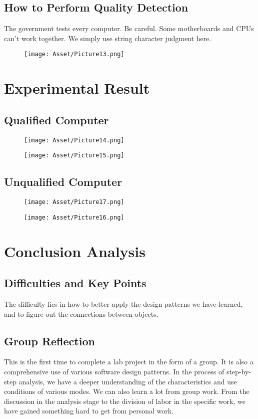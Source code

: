 \documentclass{article}
\begin{document}
\subsection{How to Perform Quality Detection}
    The government tests every computer. Be careful. Some motherboards and CPUs can't work together. We simply use string character judgment here.

\begin{figure}
\centering
\texttt{[image: Asset/Picture13.png]}
\end{figure}        
    
\section{Experimental Result}
\subsection{Qualified Computer}

\begin{figure}
\centering
\texttt{[image: Asset/Picture14.png]}
\end{figure}    

\begin{figure}
\centering
\texttt{[image: Asset/Picture15.png]}
\end{figure}    

\subsection{Unqualified Computer}

\begin{figure}
\centering
\texttt{[image: Asset/Picture17.png]}
\end{figure}    

\begin{figure}
\centering
\texttt{[image: Asset/Picture16.png]}
\end{figure}    

\section{Conclusion Analysis}
\subsection{Difficulties and Key Points}
    The difficulty lies in how to better apply the design patterns we have learned, and to figure out the connections between objects.

\subsection{Group Reflection}
    This is the first time to complete a lab project in the form of a group. It is also a comprehensive use of various software design patterns. In the process of step-by-step analysis, we have a deeper understanding of the characteristics and use conditions of various modes. We can also learn a lot from group work. From the discussion in the analysis stage to the division of labor in the specific work, we have gained something hard to get from personal work.
\end{document}
